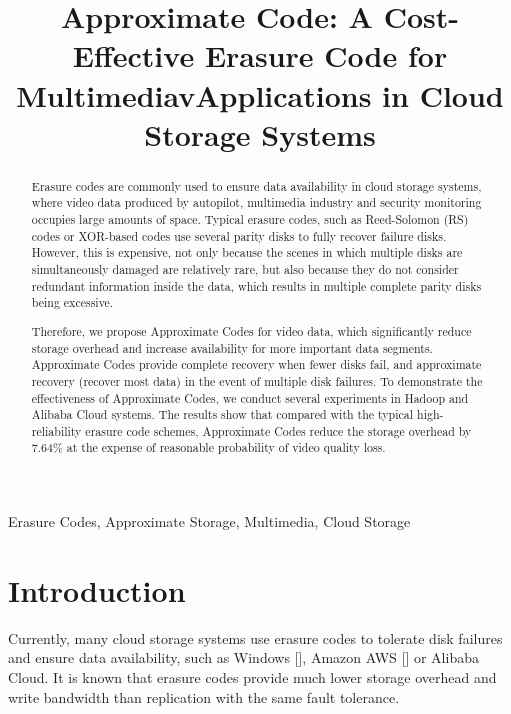 \documentclass[conference]{IEEEtran}
\begin{document}
\title{\LARGE{Approximate Code: A Cost-Effective Erasure Code for MultimediavApplications in Cloud Storage Systems}\\
}
\author{
}

\maketitle

\begin{abstract}
Erasure codes are commonly used to ensure data availability in cloud storage systems, where video data produced by autopilot, multimedia industry and security monitoring occupies large amounts of space. 
Typical erasure codes, such as Reed-Solomon (RS) \cite{macwilliams1977theory} codes or XOR-based codes use several parity disks to fully recover failure disks. 
However, this is expensive, not only because the scenes in which multiple disks are simultaneously damaged are relatively rare, but also because they do not consider redundant information inside the data, which results in multiple complete parity disks being excessive.   
   

Therefore, we propose Approximate Codes for video data, which significantly reduce storage overhead and increase availability for more important data segments.
Approximate Codes provide complete recovery when fewer disks fail, and approximate recovery (recover most data) in the event of multiple disk failures.
To demonstrate the effectiveness of Approximate Codes, we conduct several experiments in Hadoop and Alibaba Cloud systems.
The results show that compared with the typical high-reliability erasure code schemes, Approximate Codes reduce the storage overhead by 7.64\% at the expense of reasonable probability of video quality loss.

\end{abstract}

\begin{IEEEkeywords}
    Erasure Codes, Approximate Storage, Multimedia, Cloud Storage
\end{IEEEkeywords}

\section{Introduction}
Currently, many cloud storage systems use erasure codes to tolerate disk failures and ensure data availability, such as Windows [], Amazon AWS [] or Alibaba Cloud. It is known that erasure codes provide much lower storage overhead and write bandwidth than replication with the same fault tolerance.
\end{document}

